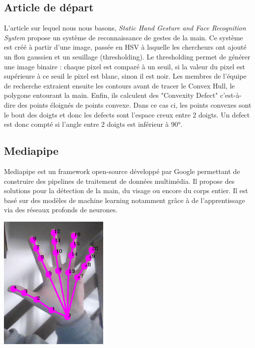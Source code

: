 \documentclass[11pt]{article}
\begin{document}
\subsection{Article de départ}
L'article sur lequel nous nous basons, \textit{Static Hand Gesture and Face Recognition System} \cite{joshi_static_2021} propose un système de reconnaissance de gestes de la main. Ce système est créé à partir d'une image, passée en HSV à laquelle les chercheurs ont ajouté un flou gaussien et un seuillage (thresholding). Le thresholding permet de générer une image binaire : chaque pixel est comparé à un seuil, si la valeur du pixel est supérieure à ce seuil le pixel est blanc, sinon il est noir. Les membres de l'équipe de recherche extraient ensuite les contours avant de tracer le Convex Hull, le polygone entourant la main. Enfin, ils calculent des "Convexity Defect" c'est-à-dire des points éloignés de points convexe. Dans ce cas ci, les points convexes sont le bout des doigts et donc les defects sont l'espace creux entre 2 doigts. Un defect est donc compté si l'angle entre 2 doigts est inférieur à 90°.

\subsection{Mediapipe}
Mediapipe \cite{mediapipe} est un framework open-source développé par Google permettant de construire des pipelines de traitement de données multimédia. Il propose des solutions pour la détection de la main, du visage ou encore du corps entier. Il est basé sur des modèles de machine learning notamment grâce à de l'apprentissage via des réseaux profonds de neurones. \bigbreak

\begin{center}
    \includegraphics[width=0.4\textwidth]{images/mediapipe_ex.png}
\end{center}
\end{document}

